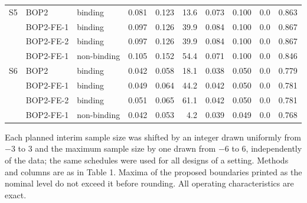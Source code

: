 \begin{table}
\begin{tabular}{lllrrrrrrr}
S5 & BOP2 & binding & 0.081 & 0.123 & 13.6 & 0.073 & 0.100 & 0.0 & 0.863 \\
 & BOP2-FE-1 & binding & 0.097 & 0.126 & 39.9 & 0.084 & 0.100 & 0.0 & 0.867 \\
 & BOP2-FE-2 & binding & 0.097 & 0.126 & 39.9 & 0.084 & 0.100 & 0.0 & 0.867 \\
 & BOP2-FE-1 & non-binding & 0.105 & 0.152 & 54.4 & 0.071 & 0.100 & 0.0 & 0.846 \\
\midrule
S6 & BOP2 & binding & 0.042 & 0.058 & 18.1 & 0.038 & 0.050 & 0.0 & 0.779 \\
 & BOP2-FE-1 & binding & 0.049 & 0.064 & 44.2 & 0.042 & 0.050 & 0.0 & 0.781 \\
 & BOP2-FE-2 & binding & 0.051 & 0.065 & 61.1 & 0.042 & 0.050 & 0.0 & 0.781 \\
 & BOP2-FE-1 & non-binding & 0.042 & 0.053 & 4.2 & 0.039 & 0.049 & 0.0 & 0.768 \\
\bottomrule
\end{tabular}
\par\medskip
\begin{minipage}{0.95\textwidth}
\footnotesize
Each planned interim sample size was shifted by an integer drawn uniformly from $-3$ to $3$ and the maximum sample size by one drawn from $-6$ to $6$, independently of the data; the same schedules were used for all designs of a setting. Methods and columns are as in Table 1. Maxima of the proposed boundaries printed as the nominal level do not exceed it before rounding. All operating characteristics are exact.
\end{minipage}
\end{table}
